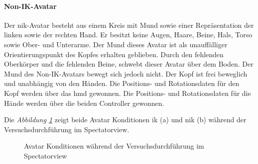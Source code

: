 \documentclass[a4paper,11pt]{article}%
\renewcommand{\\}{\vspace*{0.5\baselineskip} \newline}
\begin{document}
		\paragraph{Non-IK-Avatar}
Der \ac{nik}-Avatar besteht aus einem Kreis mit Mund sowie einer Repräsentation der linken sowie der rechten Hand. Er besitzt keine Augen, Haare, Beine, Hals, Torso sowie Ober- und Unterarme. Der Mund dieses Avatar ist als unauffälliger Orientierungspunkt des Kopfes erhalten geblieben. Durch den fehlenden Oberkörper und die fehlenden Beine, schwebt dieser Avatar über dem Boden. Der Mund des Non-IK-Avatars bewegt sich jedoch nicht. Der Kopf ist frei beweglich und unabhängig von den Händen. Die Positions- und Rotationsdaten für den Kopf werden über das \ac{hmd} gewonnen. Die Positions- und Rotationsdaten für die Hände werden über die beiden Controller gewonnen.
\newpage

Die \textit{Abbildung \ref{AvatareImEinsatz}} zeigt beide Avatar Konditionen \ac{ik} (a) und \ac{nik} (b) während der Versuchsdurchführung im Spectatorview.

\begin{figure}[h]
  \centering
  \qquad
  \caption{Avatar Konditionen während der Versuchsdurchführung im Spectatorview}
  \label{AvatareImEinsatz}
\end{figure}
\end{document}

